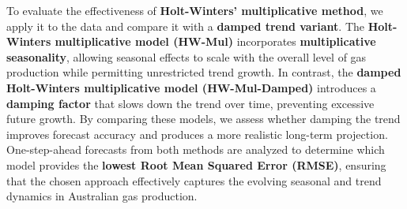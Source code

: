 \documentclass[
]{article}
\newenvironment{Shaded}{\begin{snugshade}}{\end{snugshade}}
\newcommand{\AttributeTok}[1]{\textcolor[rgb]{0.13,0.29,0.53}{#1}}
\newcommand{\ConstantTok}[1]{\textcolor[rgb]{0.56,0.35,0.01}{#1}}
\newcommand{\DecValTok}[1]{\textcolor[rgb]{0.00,0.00,0.81}{#1}}
\newcommand{\FunctionTok}[1]{\textcolor[rgb]{0.13,0.29,0.53}{\textbf{#1}}}
\newcommand{\NormalTok}[1]{#1}
\newcommand{\OtherTok}[1]{\textcolor[rgb]{0.56,0.35,0.01}{#1}}
\newcommand{\SpecialCharTok}[1]{\textcolor[rgb]{0.81,0.36,0.00}{\textbf{#1}}}
\newcommand{\StringTok}[1]{\textcolor[rgb]{0.31,0.60,0.02}{#1}}
\begin{document}
To evaluate the effectiveness of \textbf{Holt-Winters' multiplicative
method}, we apply it to the data and compare it with a \textbf{damped
trend variant}. The \textbf{Holt-Winters multiplicative model (HW-Mul)}
incorporates \textbf{multiplicative seasonality}, allowing seasonal
effects to scale with the overall level of gas production while
permitting unrestricted trend growth. In contrast, the \textbf{damped
Holt-Winters multiplicative model (HW-Mul-Damped)} introduces a
\textbf{damping factor} that slows down the trend over time, preventing
excessive future growth. By comparing these models, we assess whether
damping the trend improves forecast accuracy and produces a more
realistic long-term projection. One-step-ahead forecasts from both
methods are analyzed to determine which model provides the
\textbf{lowest Root Mean Squared Error (RMSE)}, ensuring that the chosen
approach effectively captures the evolving seasonal and trend dynamics
in Australian gas production.

\begin{Shaded}
\end{Shaded}
\end{document}
